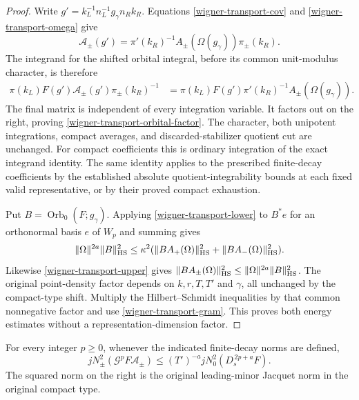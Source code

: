 \begin{proof}
Write $g'=k_L^{-1}n_L^{-1}g_\gamma n_Rk_R$.  Equations
\eqref{wigner-transport-cov} and
\eqref{wigner-transport-omega} give
\[
 \mathcal A_\pm(g')
   =\pi'(k_R)^{-1}A_\pm(\Omega(g_\gamma))\pi_\pm(k_R).
\]
The integrand for the shifted orbital integral, before its common
unit-modulus character, is therefore
\begin{align*}
 \pi(k_L)F(g')\mathcal A_\pm(g')\pi_\pm(k_R)^{-1}
 &=\pi(k_L)F(g')\pi'(k_R)^{-1}
                                    A_\pm(\Omega(g_\gamma)).
\end{align*}
The final matrix is independent of every integration variable.
It factors out on the right, proving
\eqref{wigner-transport-orbital-factor}.  The character, both
unipotent integrations, compact averages, and discarded-stabilizer
quotient cut are unchanged.  For compact coefficients this is
ordinary integration of the exact integrand identity.  The same
identity applies to the prescribed finite-decay coefficients by
the established absolute quotient-integrability bounds at each
fixed valid representative, or by their proved compact exhaustion.

Put $B=\operatorname{Orb}_0(F;g_\gamma)$.  Applying
\eqref{wigner-transport-lower} to $B^*e$ for an orthonormal
basis $e$ of $W_p$ and summing gives
\[
 \|\Omega\|^{2a}\|B\|_{\rm HS}^2
 \le\kappa^2(\|BA_+(\Omega)\|_{\rm HS}^2
                       +\|BA_-(\Omega)\|_{\rm HS}^2).
\]
Likewise \eqref{wigner-transport-upper} gives
$\|BA_\pm(\Omega)\|_{\rm HS}^2
 \le\|\Omega\|^{2a}\|B\|_{\rm HS}^2$.
The original point-density factor depends on $k,r,T,T'$ and
$\gamma$, all unchanged by the compact-type shift.  Multiply
the Hilbert--Schmidt inequalities by that common nonnegative
factor and use \eqref{wigner-transport-gram}.  This proves
both energy estimates without a representation-dimension factor.
\end{proof}

\begin{corollary}\label{wigner-transport-moment}
For every integer $p\ge0$, whenever the indicated finite-decay
norms are defined,
\begin{equation}\label{wigner-transport-norm-upper}
 jN_\pm^2(\mathcal G^pF\mathcal A_\pm)
       \le (T')^{-a}jN_0^2(D_s^{\,2p+a}F).
\end{equation}
The squared norm on the right is the original leading-minor
Jacquet norm in the original compact type.
\end{corollary}

